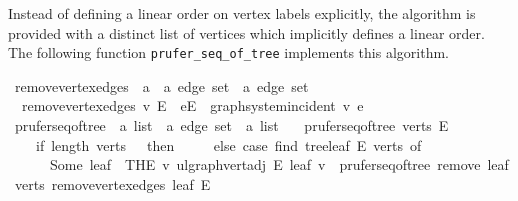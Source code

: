 Instead of defining a linear order on vertex labels explicitly, the algorithm is provided with a distinct list of vertices which implicitly defines a linear order.
The following function \texttt{prufer\_seq\_of\_tree} implements this algorithm.

\begin{isabellebox}
    \isamarkupfalse%
    \ remove{\isacharunderscore}{\kern0pt}vertex{\isacharunderscore}{\kern0pt}edges\ {\isacharcolon}{\kern0pt}{\isacharcolon}{\kern0pt}\ {\isachardoublequoteopen}{\isacharprime}{\kern0pt}a\ {\isasymRightarrow}\ {\isacharprime}{\kern0pt}a\ edge\ set\ {\isasymRightarrow}\ {\isacharprime}{\kern0pt}a\ edge\ set{\isachardoublequoteclose}\ \isanewline
    \ \ {\isachardoublequoteopen}remove{\isacharunderscore}{\kern0pt}vertex{\isacharunderscore}{\kern0pt}edges\ v\ E\ {\isacharequal}{\kern0pt}\ {\isacharbraceleft}{\kern0pt}e{\isasymin}E{\isachardot}{\kern0pt}\ {\isasymnot}\ graph{\isacharunderscore}{\kern0pt}system{\isachardot}{\kern0pt}incident\ v\ e{\isacharbraceright}{\kern0pt}{\isachardoublequoteclose}\isanewline
    \isanewline
    \isamarkupfalse%
    \ prufer{\isacharunderscore}{\kern0pt}seq{\isacharunderscore}{\kern0pt}of{\isacharunderscore}{\kern0pt}tree\ {\isacharcolon}{\kern0pt}{\isacharcolon}{\kern0pt}\ {\isachardoublequoteopen}{\isacharprime}{\kern0pt}a\ list\ {\isasymRightarrow}\ {\isacharprime}{\kern0pt}a\ edge\ set\ {\isasymRightarrow}\ {\isacharprime}{\kern0pt}a\ list{\isachardoublequoteclose}\ \isanewline
    \ \ {\isachardoublequoteopen}prufer{\isacharunderscore}{\kern0pt}seq{\isacharunderscore}{\kern0pt}of{\isacharunderscore}{\kern0pt}tree\ verts\ E\ {\isacharequal}{\kern0pt}\isanewline
    \ \ \ \ {\isacharparenleft}{\kern0pt}if\ length\ verts\ {\isasymle}\ {}\ then\ {\isacharbrackleft}{\kern0pt}{\isacharbrackright}{\kern0pt}\isanewline
    \ \ \ \ else\ {\isacharparenleft}{\kern0pt}case\ find\ {\isacharparenleft}{\kern0pt}tree{\isachardot}{\kern0pt}leaf\ E{\isacharparenright}{\kern0pt}\ verts\ of\isanewline
    \ \ \ \ \ \ Some\ leaf\ {\isasymRightarrow}\ {\isacharparenleft}{\kern0pt}THE\ v{\isachardot}{\kern0pt}\ ulgraph{\isachardot}{\kern0pt}vert{\isacharunderscore}{\kern0pt}adj\ E\ leaf\ v{\isacharparenright}{\kern0pt}\ {\isacharhash}{\kern0pt}\ prufer{\isacharunderscore}{\kern0pt}seq{\isacharunderscore}{\kern0pt}of{\isacharunderscore}{\kern0pt}tree\ {\isacharparenleft}{\kern0pt}remove{}\ leaf\ verts{\isacharparenright}{\kern0pt}\ {\isacharparenleft}{\kern0pt}remove{\isacharunderscore}{\kern0pt}vertex{\isacharunderscore}{\kern0pt}edges\ leaf\ E{\isacharparenright}{\kern0pt}{\isacharparenright}{\kern0pt}{\isacharparenright}{\kern0pt}{\isachardoublequoteclose}%
\end{isabellebox}

